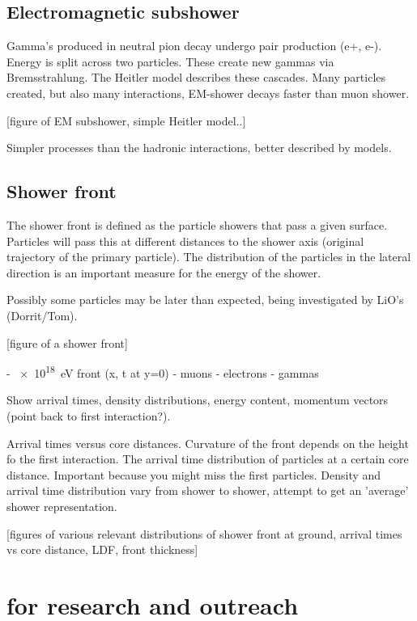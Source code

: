 \subsection{Electromagnetic subshower}

Gamma's produced in neutral pion decay undergo pair production (e+, e-). Energy is split across two particles. These create new gammas via Bremsstrahlung.
The Heitler model describes these cascades.
Many particles created, but also many interactions, EM-shower decays faster than muon shower.

[figure of EM subshower, simple Heitler model..]

Simpler processes than the hadronic interactions, better described by models.


\subsection{Shower front}

The shower front is defined as the particle showers that pass a given surface. Particles will pass this at different distances to the shower axis (original trajectory of the primary particle). The distribution of the particles in the lateral direction is an important measure for the energy of the shower.

Possibly some particles may be later than expected, being investigated by LiO's (Dorrit/Tom).

[figure of a shower front]

- \SI{e18}{\electronvolt} front (x, t at y=0)
    - muons
    - electrons
    - gammas

Show arrival times, density distributions, energy content, momentum vectors (point back to first interaction?).

Arrival times versus core distances. Curvature of the front depends on the height fo the first interaction. The arrival time distribution of particles at a certain core distance. Important because you might miss the first particles. Density and arrival time distribution vary from shower to shower, attempt to get an 'average' shower representation.

[figures of various relevant distributions of shower front at ground, arrival times vs core distance, LDF, front thickness]


\section{\hisparc for research and outreach}

